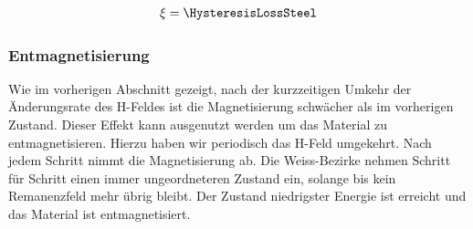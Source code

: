 \documentclass[a4paper,10pt,twocolumn]{article}
\begin{document}
    \begin{align*}
        \xi = \HysteresisLossSteel
    \end{align*}
    
    \subsubsection{Entmagnetisierung}
    
    
%    
    
    Wie im vorherigen Abschnitt gezeigt, nach der kurzzeitigen Umkehr der Änderungsrate des H-Feldes
    ist die Magnetisierung schwächer als im vorherigen Zustand.
    Dieser Effekt kann ausgenutzt werden um das Material zu entmagnetisieren.
    Hierzu haben wir periodisch das H-Feld umgekehrt.
    Nach jedem Schritt nimmt die Magnetisierung ab.
    Die Weiss-Bezirke nehmen Schritt für Schritt einen immer ungeordneteren Zustand ein, solange bis
    kein Remanenzfeld mehr übrig bleibt.
    Der Zustand niedrigster Energie ist erreicht und das Material ist entmagnetisiert.
    
\end{document}

